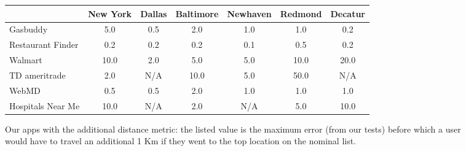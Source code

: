\begin{figure*}
 \small
 \centering
 \begin{tabular}{|l||c|c|c|c|c|c|}
 \hline
 & New York & Dallas & Baltimore & Newhaven & Redmond & Decatur \\
 \hline
 \hline
 Gasbuddy & 5.0 & 0.5 & 2.0 & 1.0 & 1.0 & 0.2 \\
\hline
Restaurant Finder & 0.2 & 0.2 & 0.2 & 0.1 & 0.5 & 0.2 \\
\hline
Walmart & 10.0 & 2.0 & 5.0 & 5.0 & 10.0 & 20.0 \\
\hline
TD ameritrade & 2.0 & N/A & 10.0 & 5.0 & 50.0 & N/A \\
\hline
WebMD & 0.5 & 0.5 & 2.0 & 1.0 & 1.0 & 1.0 \\
\hline
Hospitals Near Me & 10.0 & N/A & 2.0 & N/A & 5.0 & 10.0 \\
\hline

\end{tabular}
 \caption{Our apps with the additional distance metric: the listed value is the maximum error
(from our tests) before which a user would have to travel an additional 1 Km if they went to the top location on the nominal list.}
 \label{fig:knee-points-additional-finitediff}
\end{figure*}
